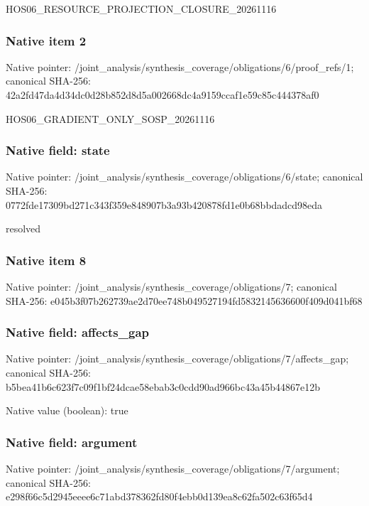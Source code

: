 \documentclass[10pt,a4paper]{article}
\begin{document}
\begingroup\raggedright\sloppy HOS06\_\allowbreak{}RESOURCE\_\allowbreak{}PROJECTION\_\allowbreak{}CLOSURE\_\allowbreak{}20261116\par\endgroup

\subsubsection{Native item 2}
Native pointer: /joint\_\allowbreak{}analysis/synthesis\_\allowbreak{}coverage/obligations/6/proof\_\allowbreak{}refs/1; canonical SHA-256: 42a2fd47da4d34dc0d28b852d8d5a002668dc4a9159ccaf1e59c85c444378af0

\begingroup\raggedright\sloppy HOS06\_\allowbreak{}GRADIENT\_\allowbreak{}ONLY\_\allowbreak{}SOSP\_\allowbreak{}20261116\par\endgroup

\subsubsection{Native field: state}
Native pointer: /joint\_\allowbreak{}analysis/synthesis\_\allowbreak{}coverage/obligations/6/state; canonical SHA-256: 0772fde17309bd271c343f359e848907b3a93b420878fd1e0b68bbdadcd98eda

\begingroup\raggedright\sloppy resolved\par\endgroup

\subsubsection{Native item 8}
Native pointer: /joint\_\allowbreak{}analysis/synthesis\_\allowbreak{}coverage/obligations/7; canonical SHA-256: e045b3f07b262739ae2d70ee748b049527194fd5832145636600f409d041bf68

\subsubsection{Native field: affects\_\allowbreak{}gap}
Native pointer: /joint\_\allowbreak{}analysis/synthesis\_\allowbreak{}coverage/obligations/7/affects\_\allowbreak{}gap; canonical SHA-256: b5bea41b6c623f7c09f1bf24dcae58ebab3c0cdd90ad966bc43a45b44867e12b

Native value (boolean): true

\subsubsection{Native field: argument}
Native pointer: /joint\_\allowbreak{}analysis/synthesis\_\allowbreak{}coverage/obligations/7/argument; canonical SHA-256: e298f66c5d2945eeee6c71abd378362fd80f4ebb0d139ea8c62fa502c63f65d4
\end{document}
